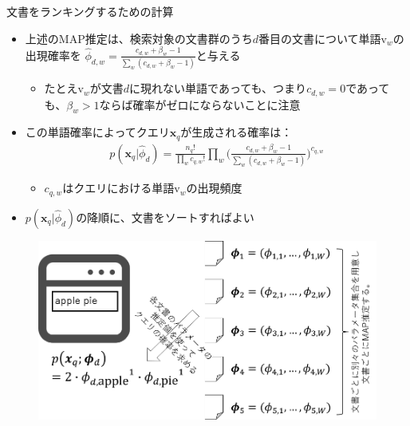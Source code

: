 \documentclass[aspectratio=169,unicode,dvipdfmx,14pt]{beamer}
\begin{document}
\begin{frame}{文書をランキングするための計算}
\begin{itemize}
\item 上述のMAP推定は、検索対象の文書群のうち$d$番目の文書について単語$\mbox{v}_w$の出現確率を
$\hat{\phi}_{d,w} = \frac{c_{d,w} + \beta_w - 1}{\sum_w (c_{d,w} + \beta_w - 1)}$と与える
\begin{itemize}
\item たとえ$\mbox{v}_w$が文書$d$に現れない単語であっても、つまり$c_{d,w}=0$であっても、$\beta_w > 1$ならば確率がゼロにならないことに注意
\end{itemize}
\item この単語確率によってクエリ$\bm{x}_q$が生成される確率は：
\begin{align}
p(\bm{x}_q | \hat{\phi}_d) = \frac{n_q!}{\prod_w c_{q,w}!}
\prod_w \bigg( \frac{c_{d,w} + \beta_w - 1}{\sum_w (c_{d,w} + \beta_w - 1)} \bigg)^{c_{q,w}}
\end{align}
\begin{itemize}
\item $c_{q,w}$はクエリにおける単語$\mbox{v}_w$の出現頻度
\end{itemize}
\item $p(\bm{x}_q | \hat{\phi}_d)$の降順に、文書をソートすればよい
\end{itemize}
\end{frame}

\begin{frame}
\begin{figure}[htbp]
\begin{center}
\includegraphics[scale=0.42]{IR_MAP.png}
\label{}
\end{center}
\end{figure}
\end{frame}
\end{document}
